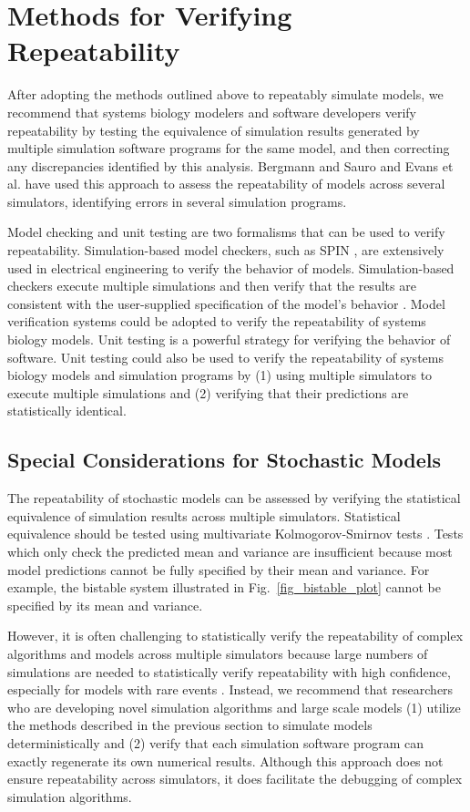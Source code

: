 \documentclass[journal,transmag,twoside]{IEEEtran}
\begin{document}
\section{Methods for Verifying Repeatability} \label{validationSection}
After adopting the methods outlined above to repeatably simulate models, we recommend that systems biology modelers and software developers verify repeatability by testing the equivalence of simulation results generated by multiple simulation software programs for the same model, and then correcting any discrepancies identified by this analysis. Bergmann and Sauro \cite{bergmann2008comparing} and Evans et al. \cite{evans2008sbml} have used this approach to assess the repeatability of models across several simulators, identifying errors in several simulation programs.

Model checking and unit testing are two formalisms that can be used to verify repeatability. Simulation-based model checkers, such as SPIN \cite{holzmann1997model}, are extensively used in electrical engineering to verify the behavior of models. Simulation-based checkers execute multiple simulations and then verify that the results are consistent with the user-supplied specification of the model's behavior \cite{kwiatkowska2011prism}. Model verification systems could be adopted to verify the repeatability of systems biology models. Unit testing is a powerful strategy for verifying the behavior of software. Unit testing could also be used to verify the repeatability of systems biology models and simulation programs by (1) using multiple simulators to execute multiple simulations and (2) verifying that their predictions are statistically identical.

\subsection{Special Considerations for Stochastic Models}
The repeatability of stochastic models can be assessed by verifying the statistical equivalence of simulation results across multiple simulators. Statistical equivalence should be tested using multivariate Kolmogorov-Smirnov tests \cite{justel1997multivariate}. Tests which only check the predicted mean and variance are insufficient because most model predictions cannot be fully specified by their mean and variance. For example, the bistable system illustrated in Fig.~\ref{fig_bistable_plot} cannot be specified by its mean and variance. 

However, it is often challenging to statistically verify the repeatability of complex algorithms and models across multiple simulators because large numbers of simulations are needed to statistically verify repeatability with high confidence, especially for models with rare events \cite{kim2013nonlinear}. Instead, we recommend that researchers who are developing novel simulation algorithms and large scale models (1) utilize the methods described in the previous section to simulate models deterministically and (2) verify that each simulation software program can exactly regenerate its own numerical results. Although this approach does not ensure repeatability across simulators,  it does facilitate the debugging of complex simulation algorithms.
\end{document}
